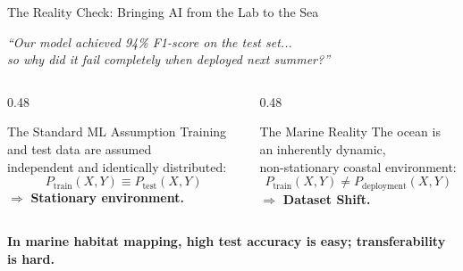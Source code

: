 \documentclass[aspectratio=169,10pt]{beamer}
\begin{document}
\begin{frame}{The Reality Check: Bringing AI from the Lab to the Sea}
  \begin{center}
    \large\textit{``Our model achieved 94\% F1-score on the test set...\\
    so why did it fail completely when deployed next summer?''}
  \end{center}
  \vspace{0.3cm}
  \begin{columns}[T,onlytextwidth]
    \begin{column}{0.48\textwidth}
      \begin{block}{The Standard ML Assumption}
        Training and test data are assumed\\
        independent and identically distributed:
        \begin{equation*}
          P_{\text{train}}(X, Y) \equiv P_{\text{test}}(X, Y)
        \end{equation*}
        $\Rightarrow$ \textbf{Stationary environment.}
      \end{block}
    \end{column}
    \begin{column}{0.48\textwidth}
      \begin{alertblock}{The Marine Reality}
        The ocean is an inherently dynamic,\\
        non-stationary coastal environment:
        \begin{equation*}
          P_{\text{train}}(X, Y) \neq P_{\text{deployment}}(X, Y)
        \end{equation*}
        $\Rightarrow$ \textbf{Dataset Shift.}
      \end{alertblock}
    \end{column}
  \end{columns}
  \vspace{0.3cm}
  \centering
  \textbf{In marine habitat mapping, high test accuracy is easy; transferability is hard.}
\end{frame}
\end{document}
